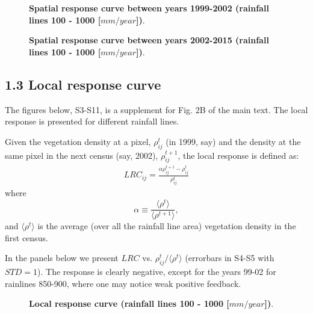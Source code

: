 \documentclass[aps,pre,twocolumn]{revtex4-1}
\begin{document}
\newpage
\pagebreak

\begin{figure}[H]
	
	
	\vspace{1.0pt}
	
	\caption{\textbf{Spatial response curve between years 1999-2002 (rainfall lines 100 - 1000 [$mm/year$])}.}
\end{figure}

\begin{figure}[H]
	
	
	\vspace{1.0pt}
	
	\caption{\textbf{Spatial response curve between years 2002-2015 (rainfall lines 100 - 1000 [$mm/year$])}.}
\end{figure}


\pagebreak
\subsection*{1.3 Local response curve} The figures below,  S3-S11, is a supplement for Fig. 2B of the main text. The local response is presented for different rainfall lines.

Given the vegetation density at a pixel, $\rho_{ij}^t$ (in 1999, say) and the density at the same pixel in the next census (say, 2002), $\rho_{ij}^{t+1}$,  the local response is defined as:
\begin{eqnarray} \label{LRC}
LRC_{ij}=\frac{\alpha \rho_{ij}^{t+1}-\rho_{ij}^t}{\rho_{ij}^t}
\end{eqnarray}
where  $$\alpha \equiv \frac{\langle \rho^t \rangle}{\langle \rho^{t+1} \rangle},$$
 and $\langle \rho^t \rangle$ is the average (over all the rainfall line area) vegetation density in the first census.

In the panels below we present $LRC$ vs.  $\rho_{ij}^t/\langle \rho^t \rangle$ (errorbars in S4-S5 with $STD=1$). The response is clearly negative, except for the years 99-02 for rainlines 850-900, where one may notice weak positive feedback.

\newpage
\pagebreak

\begin{figure}[H]
	
	
	\vspace{1.0pt}
	
	\caption{\textbf{Local response curve (rainfall lines 100 - 1000 [$mm/year$])}.}
\end{figure}
\end{document}
